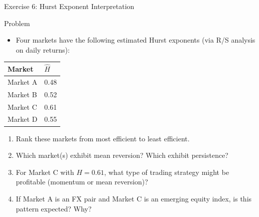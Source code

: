 \documentclass[9pt, aspectratio=169, t]{beamer}
\theoremstyle{definition}
\newenvironment{cminipage}[1]{%
    \par\noindent\hfill\begin{minipage}{#1}\ignorespaces
}{%
    \end{minipage}\hfill\null\par
}
\begin{document}
\begin{frame}{Exercise 6: Hurst Exponent Interpretation}
\begin{cminipage}{0.95\textwidth}
\small
\begin{block}{Problem}
\begin{itemize}\setlength{\itemsep}{0pt}
\item Four markets have the following estimated Hurst exponents (via R/S analysis on daily returns):
\end{itemize}
\begin{center}
{\small
\renewcommand{\arraystretch}{1.1}
\begin{tabular}{ll}
\toprule
\textbf{Market} & \textbf{$\hat{H}$} \\
\midrule
Market A & 0.48 \\
Market B & 0.52 \\
Market C & 0.61 \\
Market D & 0.55 \\
\bottomrule
\end{tabular}
}
\end{center}
\end{block}
\begin{enumerate}
    \item Rank these markets from most efficient to least efficient.
    \item Which market(s) exhibit mean reversion? Which exhibit persistence?
    \item For Market C with $H = 0.61$, what type of trading strategy might be profitable (momentum or mean reversion)?
    \item If Market A is an FX pair and Market C is an emerging equity index, is this pattern expected? Why?
\end{enumerate}
\end{cminipage}
\end{frame}
\end{document}
